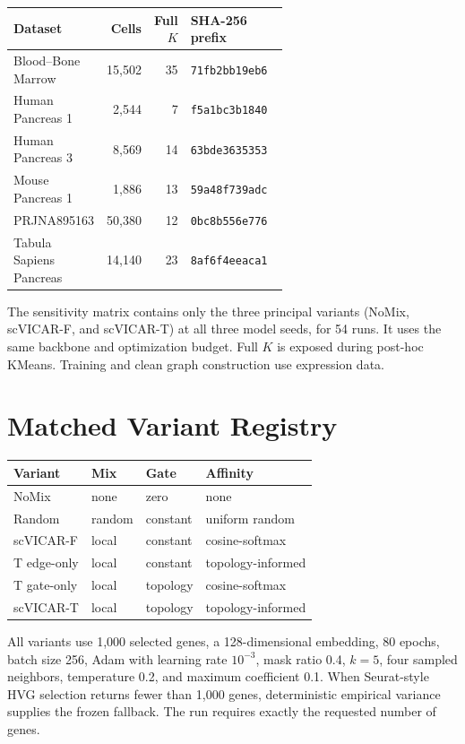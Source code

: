 \documentclass[11pt]{article}
\begin{document}
\begin{longtable}{p{0.25\linewidth}rrp{0.36\linewidth}}
\toprule
Dataset & Cells & Full $K$ & SHA-256 prefix\\
\midrule
\endhead
Blood--Bone Marrow & 15,502 & 35 & \texttt{71fb2bb19eb6}\\
Human Pancreas 1 & 2,544 & 7 & \texttt{f5a1bc3b1840}\\
Human Pancreas 3 & 8,569 & 14 & \texttt{63bde3635353}\\
Mouse Pancreas 1 & 1,886 & 13 & \texttt{59a48f739adc}\\
PRJNA895163 & 50,380 & 12 & \texttt{0bc8b556e776}\\
Tabula Sapiens Pancreas & 14,140 & 23 & \texttt{8af6f4eeaca1}\\
\bottomrule
\end{longtable}

The sensitivity matrix contains only the three principal variants (NoMix,
scVICAR-F, and scVICAR-T) at all three model seeds, for 54 runs.  It uses the
same backbone and optimization budget. Full $K$ is exposed during post-hoc
KMeans. Training and clean graph construction use expression data.



\section{Matched Variant Registry}

\begin{table}[h]
\centering
\begin{tabular}{llll}
\toprule
Variant & Mix & Gate & Affinity\\
\midrule
NoMix & none & zero & none\\
Random & random & constant & uniform random\\
scVICAR-F & local & constant & cosine-softmax\\
T edge-only & local & constant & topology-informed\\
T gate-only & local & topology & cosine-softmax\\
scVICAR-T & local & topology & topology-informed\\
\bottomrule
\end{tabular}
\end{table}

All variants use 1,000 selected genes, a 128-dimensional embedding, 80 epochs,
batch size 256, Adam with learning rate $10^{-3}$, mask ratio 0.4, $k=5$, four
sampled neighbors, temperature 0.2, and maximum coefficient 0.1. When
Seurat-style HVG selection returns fewer than 1,000 genes, deterministic
empirical variance supplies the frozen fallback. The run requires exactly the
requested number of genes.
\end{document}
